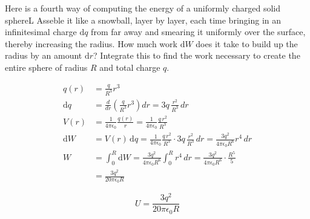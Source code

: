 \begin{hwkProblem}{2.35}{}

	Here is a fourth way of computing the energy of a uniformly charged solid sphereL Asseble it like a snowball, layer by layer, each time bringing in an infinitesimal charge \( \text{d}q \) from far away and smearing it uniformly over the surface, thereby increasing the radius. How much work \( \text{d}W \) does it take to build up the radius by an amount \( \text{d}r \)? Integrate this to find the work necessary to create the entire sphere of radius \( R \) and total charge \( q \).

	\hwkSol

	\begin{align*}
		q(r) &= \frac{q}{R^3}r^3 \\
		\text{d}q &= \frac{d}{dr}\left(\frac{q}{R^3}r^3\right)dr = 3q\,\frac{r^2}{R^3}\,dr \\
		V(r) &= \frac{1}{4\pi\epsilon_0}\frac{q(r)}{r} = \frac{1}{4\pi\epsilon_0}\frac{q\,r^2}{R^3} \\
		\text{d}W &= V(r)\,\text{d}q = \frac{1}{4\pi\epsilon_0}\frac{q\,r^2}{R^3}\cdot 3q\,\frac{r^2}{R^3}\,dr = \frac{3q^2}{4\pi\epsilon_0 R^6}r^4\,dr \\
		W &= \int_0^R \text{d}W = \frac{3q^2}{4\pi\epsilon_0 R^6}\int_0^R r^4\,dr = \frac{3q^2}{4\pi\epsilon_0 R^6}\cdot\frac{R^5}{5} \\
		  &= \frac{3q^2}{20\pi\epsilon_0 R}
	\end{align*}

	\[
		\boxed{U = \frac{3q^2}{20\pi\epsilon_0 R}}
	\]

\end{hwkProblem}
